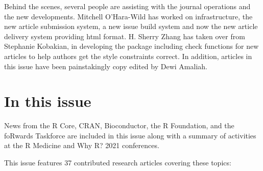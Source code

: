 Behind the scenes, several people are assisting with the journal operations and the new developments. Mitchell O'Hara-Wild has worked on infrastructure, the new article submission system, a new issue build system and now the new article delivery system providing html format. H. Sherry Zhang has taken over from Stephanie Kobakian, in developing the  package including check functions for new articles to help authors get the style constraints correct. In addition, articles in this issue have been painstakingly copy edited by Dewi Amaliah.

\hypertarget{in-this-issue}{%
\section{In this issue}\label{in-this-issue}}

News from the R Core, CRAN, Bioconductor, the R Foundation, and the foRwards Taskforce are included in this issue along with a summary of activities at the R Medicine and Why R? 2021 conferences.

This issue features 37 contributed research articles covering these topics:


